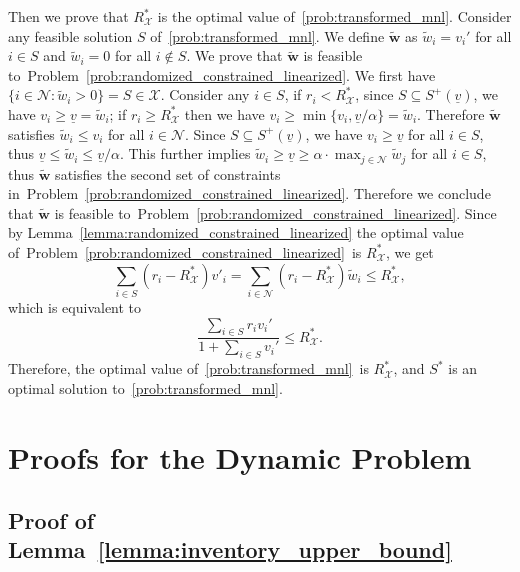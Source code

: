 \documentclass[mnsc,non-blindrev]{informs3}
\theoremstyle{definition}
\begin{document}
\begin{appendices}{\Large{}}
Then we prove that $R_{\mathcal{X}}^*$ is the optimal value of~\ref{prob:transformed_mnl}. Consider any feasible solution $S$ of~\ref{prob:transformed_mnl}. We define $\tilde{\bm{w}}$ as $\tilde{w}_i=v_i'$ for all $i\in S$ and $\tilde{w}_i=0$ for all $i\notin S$. We prove that $\tilde{\bm{w}}$ is feasible to~Problem~\eqref{prob:randomized_constrained_linearized}. We first have $\{i\in\mathcal{N}:\tilde{w}_i>0\}=S\in\mathcal{X}$. Consider any $i\in S$, if $r_i<R_{\mathcal{X}}^*$, since $S\subseteq S^+(\underline{v})$, we have $v_i\geq \underline{v}=\tilde{w}_i$; if $r_i\geq R_{\mathcal{X}}^*$ then we have $v_i\geq \min\{v_i,\underline{v}/\alpha\}=\tilde{w}_i$. Therefore $\tilde{\bm{w}}$ satisfies $\tilde{w}_i\leq v_i$ for all $i\in\mathcal{N}$. Since $S\subseteq S^+(\underline{v})$, we have $v_i\geq \underline{v}$ for all $i\in S$, thus $\underline{v}\leq \tilde{w}_i\leq \underline{v}/\alpha$. This further implies $\tilde{w}_i\geq \underline{v}\geq \alpha\cdot\max_{j\in\mathcal{N}}\tilde{w}_j$ for all $i\in S$, thus $\tilde{\bm{w}}$ satisfies the second set of constraints in~Problem~\eqref{prob:randomized_constrained_linearized}. Therefore we conclude that $\tilde{\bm{w}}$ is feasible to~Problem~\eqref{prob:randomized_constrained_linearized}. Since by Lemma~\ref{lemma:randomized_constrained_linearized} the optimal value of~Problem~\eqref{prob:randomized_constrained_linearized}~is $R^*_{\mathcal{X}}$, we get
\begin{equation*}
\sum_{i\in S}(r_i-R_{\mathcal{X}}^*)v'_i=\sum_{i\in \mathcal{N}}(r_i-R_{\mathcal{X}}^*)\tilde{w}_i\leq R_{\mathcal{X}}^*,
\end{equation*}
which is equivalent to
\begin{equation*}
\dfrac{\sum_{i\in S}r_iv_i'}{1+\sum_{i\in S}v_i'}\leq R_{\mathcal{X}}^*.
\end{equation*}
Therefore, the optimal value of~\ref{prob:transformed_mnl}~is $R_{\mathcal{X}}^*$, and $S^*$ is an optimal solution to~\ref{prob:transformed_mnl}.

\section{Proofs for the Dynamic Problem}

\subsection{Proof of Lemma~\ref{lemma:inventory_upper_bound}}\label{sec:lemma:inventory_upper_bound}


\end{appendices}
\end{document}
